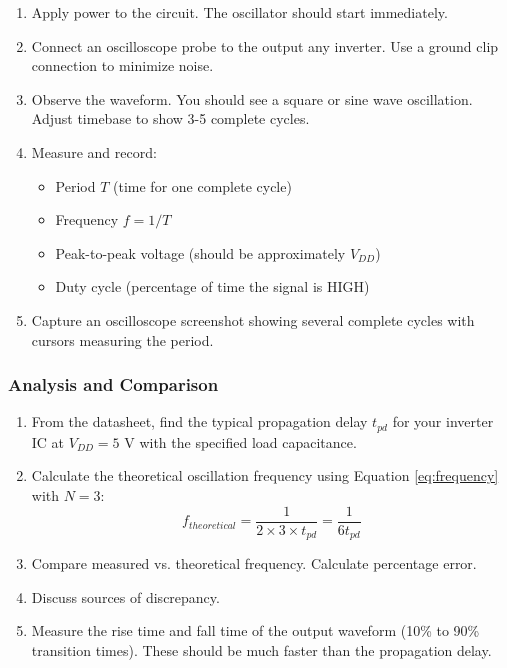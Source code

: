\documentclass[10pt]{article}
\begin{document}
\begin{enumerate}
    \item Apply power to the circuit.  The oscillator should start immediately.
    
    \item Connect an oscilloscope probe to the output any inverter. Use a ground clip connection to minimize noise.
    
    \item Observe the waveform.  You should see a square or sine wave oscillation.  Adjust timebase to show 3-5 complete cycles.
    
    \item Measure and record:
    \begin{itemize}
        \item Period $T$ (time for one complete cycle)
        \item Frequency $f = 1/T$
        \item Peak-to-peak voltage (should be approximately $V_{DD}$)
        \item Duty cycle (percentage of time the signal is HIGH)
    \end{itemize}
    
    \item Capture an oscilloscope screenshot showing several complete cycles with cursors measuring the period. 
\end{enumerate}

\subsubsection{Analysis and Comparison}

\begin{enumerate}
    \item From the datasheet, find the typical propagation delay $t_{pd}$ for your inverter IC at $V_{DD} = 5$ V with the specified load capacitance.
    
    \item Calculate the theoretical oscillation frequency using Equation \ref{eq:frequency} with $N = 3$:
    \begin{equation}
        f_{theoretical} = \frac{1}{2 \times 3 \times t_{pd}} = \frac{1}{6 t_{pd}}
    \end{equation}
    
    \item Compare measured vs. theoretical frequency. Calculate percentage error.
    
    \item Discuss sources of discrepancy.
    
    \item Measure the rise time and fall time of the output waveform (10\% to 90\% transition times). These should be much faster than the propagation delay. 
\end{enumerate}
\end{document}
